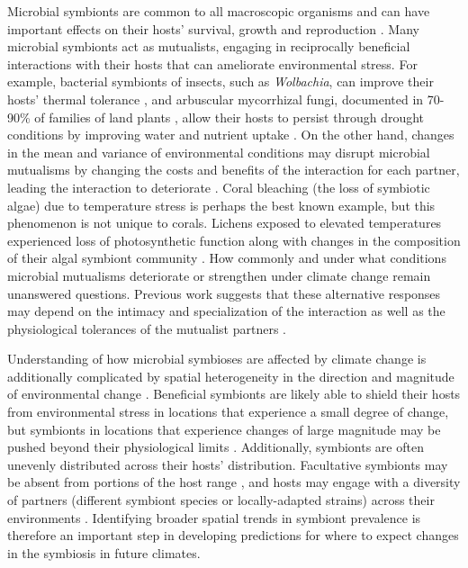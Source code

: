 \documentclass[11pt]{article}
\let\cite\citep
\begin{document}
Microbial symbionts are common to all macroscopic organisms and can have important effects on their hosts' survival, growth and reproduction \cite{rodriguez2009fungal,mcfall2013animals}.
Many microbial symbionts act as mutualists, engaging in reciprocally beneficial interactions with their hosts that can ameliorate environmental stress. 
For example, bacterial symbionts of insects, such as \emph{Wolbachia}, can improve their hosts' thermal tolerance \citep{truitt2019wolbachia, renoz2019evolutionary}, and arbuscular mycorrhizal fungi, documented in 70-90\% of families of land plants \citep{parniske2008arbuscular}, allow their hosts to persist through drought conditions by improving water and nutrient uptake \citep{cheng2021elucidating}.
On the other hand, changes in the mean and variance of environmental conditions may disrupt microbial  mutualisms by changing the costs and benefits of the interaction for each partner, leading the interaction to deteriorate \citep{aslan2013mutualism, fowler2024microbial}. 
Coral bleaching (the loss of symbiotic algae) due to temperature stress \citep{sully2019global} is perhaps the best known example, but this phenomenon is not unique to corals.
Lichens exposed to elevated temperatures experienced loss of photosynthetic function along with changes in the composition of their algal symbiont community \citep{meyer2022climate}.
How commonly and under what conditions microbial mutualisms deteriorate or strengthen under climate change remain unanswered questions.
Previous work suggests that these alternative responses may depend on the intimacy and specialization of the interaction as well as the physiological tolerances of the mutualist partners \citep{toby2010mutualisms, warren2014mutualism, rafferty2015phenological}. 

Understanding of how microbial symbioses are affected by climate change is additionally complicated by spatial heterogeneity in the direction and magnitude of environmental change \cite{ipcc_2021}. 
Beneficial symbionts are likely able to shield their hosts from environmental stress in locations that experience a small degree of change, but symbionts in locations that experience changes of large magnitude may be pushed beyond their physiological limits \cite{webster2008temperature}.
Additionally, symbionts are often unevenly distributed across their hosts' distribution.
Facultative symbionts may be absent from portions of the host range \cite{afkhami2014mutualist}, and hosts may engage with a diversity of partners (different symbiont species or locally-adapted strains) across their environments \cite{frade2008variation, rolshausen2018quantifying}.
Identifying broader spatial trends in symbiont prevalence is therefore an important step in developing predictions for where to expect changes in the symbiosis in future climates.
\end{document}

